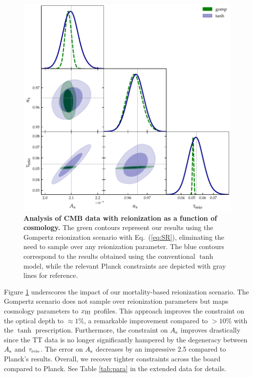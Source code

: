 \begin{figure}
\centering
\includegraphics[width=\linewidth]{figs/gomp_tanh_triangle_kill.pdf}
\caption{\textbf{Analysis of CMB data with reionization as a function of
cosmology.}
The green contours represent our results using the Gompertz reionization
scenario with Eq.~(\ref{eq:SR}), eliminating the need to sample over any
reionization parameter.
The blue contours correspond to the results obtained using the
conventional $\tanh$ model, while the relevant Planck constraints
\cite{Planck2020a} are depicted with gray lines for reference.}
\label{fig:kill}
\end{figure}

Figure \ref{fig:kill} underscores the impact of our mortality-based
reionization scenario.
The Gompertz scenario does not sample over reionization parameters but
maps cosmology parameters to $x_{\mathrm{HI}}$ profiles.
This approach improves the constraint on the optical depth to $\approx
1\%$, a remarkable improvement compared to $> 10\%$ with the $\tanh$
prescription.
Furthermore, the constraint on $A_\mathrm{s}$ improves drastically since the TT
data is no longer significantly hampered by the degeneracy between $A_\mathrm{s}$
and $\tau_{\mathrm{reio}}$.
The error on $A_\mathrm{s}$ decreases by an impressive 2.5 compared to Planck's
results\cite{Planck2020a}.
Overall, we recover tighter constraints across the board compared to
Planck.
See Table \ref{tab:para} in the extended data for details.


